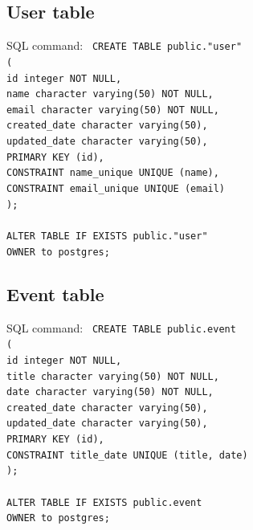 \subsection{User table}\label{subsec:user-table}

SQL command: \newline
\texttt{
    CREATE TABLE public."user" \\
    ( \\
    id integer NOT NULL, \\
    name character varying(50) NOT NULL, \\
    email character varying(50) NOT NULL, \\
    created\_date character varying(50), \\
    updated\_date character varying(50), \\
    PRIMARY KEY (id), \\
    CONSTRAINT name\_unique UNIQUE (name), \\
    CONSTRAINT email\_unique UNIQUE (email) \\
    ); \\
    \\
    ALTER TABLE IF EXISTS public."user" \\
    OWNER to postgres; \\
}

\subsection{Event table}\label{subsec:event-table}

SQL command: \newline
\texttt{
    CREATE TABLE public.event \\
    ( \\
    id integer NOT NULL,\\
    title character varying(50) NOT NULL,\\
    date character varying(50) NOT NULL,\\
    created\_date character varying(50),\\
    updated\_date character varying(50),\\
    PRIMARY KEY (id),\\
    CONSTRAINT title\_date UNIQUE (title, date)\\
    );\\
    \\
    ALTER TABLE IF EXISTS public.event\\
    OWNER to postgres;\\
}

